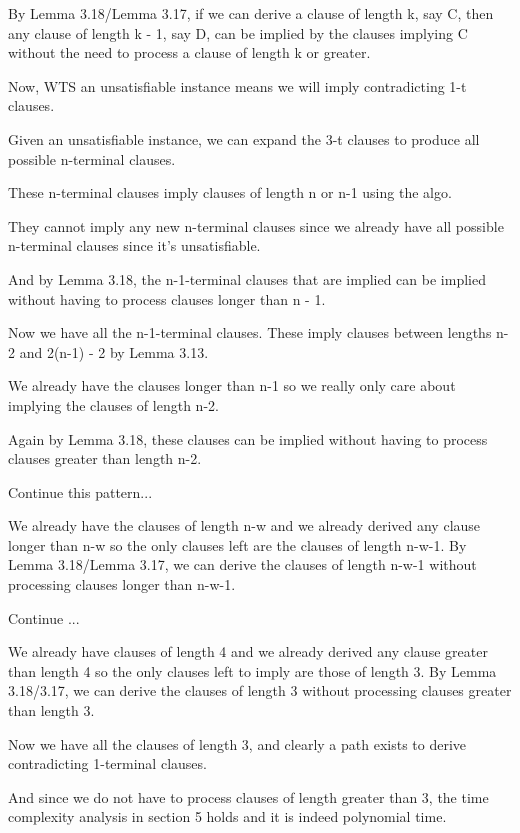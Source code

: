 \documentclass[manuscript]{acmart}
\begin{document}
    By Lemma 3.18/Lemma 3.17, if we can derive a clause of length k, say C, then
    any clause of length k - 1, say D, can be implied by 
    the clauses implying C without the need to process a clause of length 
    k or greater.

    Now, WTS an unsatisfiable instance means we will imply contradicting 1-t clauses.

    Given an unsatisfiable instance, we can expand the 3-t clauses to produce
    all possible n-terminal clauses.

    These n-terminal clauses imply clauses of length n or n-1 using the algo.

    They cannot imply any new n-terminal clauses since we already have all possible
    n-terminal clauses since it's unsatisfiable.

    And by Lemma 3.18, the n-1-terminal clauses that are implied can be implied
    without having to process clauses longer than n - 1.

    Now we have all the n-1-terminal clauses. These imply clauses between
    lengths n-2 and 2(n-1) - 2 by Lemma 3.13.

    We already have the clauses longer than n-1 so we really only care about
    implying the clauses of length n-2. 

    Again by Lemma 3.18, these clauses can be implied without having to
    process clauses greater than length n-2.

    Continue this pattern...

    We already have the clauses of length n-w and we already derived any clause
    longer than n-w so the only clauses left are the clauses of length n-w-1.
    By Lemma 3.18/Lemma 3.17, we can derive the clauses of length n-w-1 without
    processing clauses longer than n-w-1.

    Continue ...

    We already have clauses of length 4 and we already derived any clause greater
    than length 4 so the only clauses left to imply are those of length 3.
    By Lemma 3.18/3.17, we can derive the clauses of length 3 without processing
    clauses greater than length 3. 

    Now we have all the clauses of length 3, and clearly a path exists to derive
    contradicting 1-terminal clauses.

    And since we do not have to process clauses of length greater than 3, the 
    time complexity analysis in section 5 holds and it is indeed polynomial time.
\end{document}
